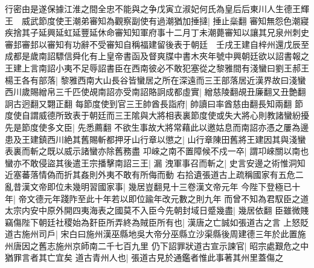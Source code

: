 行密由是遂保據江淮之間全忠不能與之争戊寅立淑妃何氏為皇后后東川人生德王輝王　威武節度使王潮弟審知為觀察副使有過潮猶加捶撻|{
	捶止橤翻}
審知無怨色潮寢疾捨其子延興延虹延豐延休命審知知軍府事十二月丁未潮薨審知以讓其兄泉州刺史審邽審邽以審知有功辭不受審知自稱福建留後表于朝廷　壬戌王建自梓州還戊辰至成都是歲南詔驃信舜化有上皇帝書函及督爽牒中書木夾年號中興朝廷欲以詔書報之王建上言南詔小夷不足辱詔書臣在西南彼必不敢犯塞從之黎雅間有淺蠻曰劉王郝王楊王各有部落|{
	黎雅西南大山長谷皆蠻居之所在深遠而三王部落居近漢界故曰淺蠻}
西川歲賜繒帛三千匹使覘南詔亦受南詔賂詗成都虛實|{
	繒慈陵翻覘丑廉翻又丑艶翻詗古迥翻又翾正翻}
每節度使到官三王帥酋長詣府|{
	帥讀曰率酋慈由翻長知兩翻}
節度使自謂威德所致表于朝廷而三王隂與大將相表裏節度使或失大將心則教諸蠻紛擾先是節度使多文臣|{
	先悉薦翻}
不欲生事故大將常藉此以邀姑息而南詔亦憑之屢為邊患及王建鎮西川絶其舊賜斬都押牙山行章以懲之|{
	山行章陳田舊將王建因其與淺蠻表裏而斬之既以威示諸蠻亦除舊務盡}
卭崍之南不置障候不戍一卒|{
	謂卭崍關以南也}
蠻亦不敢侵盜其後遣王宗播擊南詔三王|{
	漏}
洩軍事召而斬之|{
	史言安邊之術惟洞知近塞蕃落情偽而折其姦則外夷不敢有所侮而動}
右拾遺張道古上疏稱國家有五危二亂昔漢文帝即位未幾明習國家事|{
	幾居豈翻見十三卷漢文帝元年}
今陛下登極已十年|{
	帝文德元年踐阼至此十年若以即位踰年改元數之則九年}
而曾不知為君馭臣之道太宗内安中原外開四夷海表之國莫不入臣今先朝封域日蹙幾盡|{
	幾居依翻}
臣雖微賤竊傷陛下朝廷社稷始為姧臣所弄終為賊臣所有也|{
	漢唐之亡誠如張道古之言}
上怒貶道古施州司戶|{
	宋白曰施州漢巫縣地吳大帝分巫縣立沙渠縣後周建德三年於此置施州唐因之舊志施州京師南二千七百九里}
仍下詔罪狀道古宣示諫官|{
	昭宗處艱危之中猶罪言者其亡宜矣}
道古青州人也|{
	張道古見於通鑑者惟此事著其州里蓋傷之}


